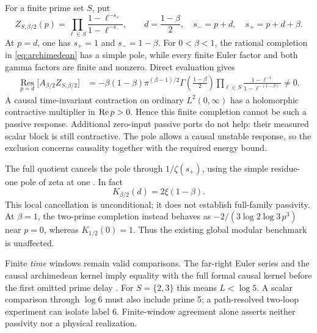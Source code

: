 For a finite prime set $S$, put
\begin{equation}
 Z_{S,\beta/2}(p)=\prod_{\ell\in S}
 \frac{1-\ell^{-s_+}}{1-\ell^{-s_-}},\qquad
 d=\frac{1-\beta}{2},\quad s_-=p+d,\quad s_+=p+d+\beta.
\end{equation}
At $p=d$, one has $s_+=1$ and $s_-=1-\beta$. For $0<\beta<1$,
the rational completion in \eqref{eq:archimedean} has a simple pole,
while every finite Euler factor and both gamma factors are finite and
nonzero. Direct evaluation gives
\begin{align}
 \operatorname*{Res}_{p=d}\bigl[A_{\beta/2}Z_{S,\beta/2}\bigr]
 &=-\beta(1-\beta)\pi^{(\beta-1)/2}
 \Gamma\!\left(\frac{1-\beta}{2}\right)
 \prod_{\ell\in S}\frac{1-\ell^{-1}}{1-\ell^{-(1-\beta)}}
 \ne0.
 \label{eq:finite_euler_pole}
\end{align}
A causal time-invariant contraction on ordinary $L^2(0,\infty)$ has
a holomorphic contractive multiplier in $\operatorname{Re} p>0$. Hence this finite
completion cannot be such a passive response. Additional zero-input
passive ports do not help: their measured scalar block is still
contractive. The pole allows a causal unstable response, so the
exclusion concerns causality together with the required energy bound.

The full quotient cancels the pole through $1/\zeta(s_+)$, using the
simple residue-one pole of zeta at one \cite{DLMF}. In fact
\begin{equation}
 K_{\beta/2}(d)=2\xi(1-\beta).
\end{equation}
This local cancellation is unconditional; it does not establish
full-family passivity. At $\beta=1$, the two-prime completion instead
behaves as $-2/(3\log2\log3\,p^3)$ near $p=0$, whereas
$K_{1/2}(0)=1$. Thus the existing global modular benchmark is unaffected.

Finite \emph{time} windows remain valid comparisons. The far-right
Euler series and the causal archimedean kernel imply equality with the
full formal causal kernel before the first omitted prime delay
\cite[Section~7]{InterfaceNote}. For $S=\{2,3\}$ this means
$L<\log5$. A scalar comparison through $\log6$ must also include
prime 5; a path-resolved two-loop experiment can isolate label 6.
Finite-window agreement alone asserts neither passivity nor a physical
realization.
